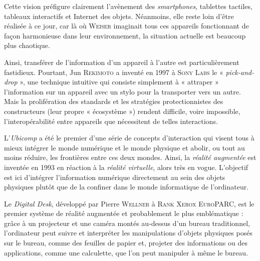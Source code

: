 Cette vision préfigure clairement l'avènement des \textit{smartphones}, tablettes tactiles, tableaux interactifs et Internet des objets. Néanmoins, elle reste loin d'être réalisée à ce jour, car là où \textsc{Weiser} imaginait tous ces appareils fonctionnant de façon harmonieuse dans leur environnement, la situation actuelle est beaucoup plus chaotique. 

Ainsi, transférer de l’information d’un appareil à l’autre est particulièrement fastidieux. Pourtant, Jun \textsc{Rekimoto} a inventé en 1997 à \textsc{Sony Labs} le « \textit{pick-and-drop} », une technique intuitive qui consiste simplement à « attraper » l’information sur un appareil avec un stylo pour la transporter vers un autre. Mais la prolifération des standards et les stratégies protectionnistes des constructeurs (leur propre « écosystème ») rendent difficile, voire impossible, l’interopérabilité entre appareils que nécessitent de telles interactions.

L’\textit{Ubicomp} a été le premier d’une série de concepts d’interaction qui visent tous à mieux intégrer le monde numérique et le monde physique et abolir, ou tout au moins réduire, les frontières entre ces deux mondes. Ainsi, la \emph{réalité augmentée} est inventée en 1993 en réaction à la \emph{réalité virtuelle}, alors très en vogue. L'objectif est ici d'intégrer l'information numérique directement au sein des objets physiques plutôt que de la confiner dans le monde informatique de l'ordinateur.

Le \textit{Digital Desk}, développé par Pierre \textsc{Wellner} à \textsc{Rank Xerox EuroPARC}, est le premier système de réalité augmentée et probablement le plus emblématique : grâce à un projecteur et une caméra montés au-dessus d'un bureau traditionnel, l'ordinateur peut suivre et interpréter les manipulations d'objets physiques posés sur le bureau, comme des feuilles de papier et, projeter des informations ou des applications, comme une calculette, que l'on peut manipuler à même le bureau. 

